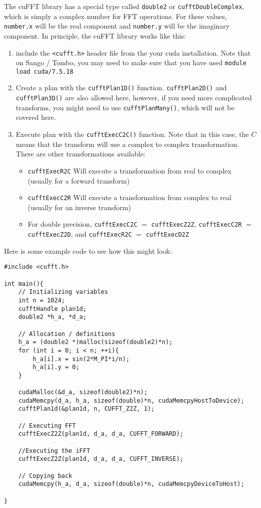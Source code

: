 \documentclass[11pt]{article}
\begin{document}
The cuFFT library has a special type called \lstinline{double2} or \lstinline{cufftDoubleComplex}, which is simply a complex number for FFT operations. For these values, \lstinline{number.x} will be the real component and \lstinline{number.y} will be the imaginary component. In principle, the cuFFT library works like this:
\begin{enumerate}
\item include the \lstinline{<cufft.h>} header file from the your cuda installation. Note that on Sango / Tombo, you may need to make sure that you have used \lstinline{module load cuda/7.5.18}
\item Create a plan with the \lstinline{cufftPlan1D()} function. \lstinline{cufftPlan2D()} and \lstinline{cufftPlan3D()} are also allowed here, however, if you need more complicated transforms, you might need to use \lstinline{cufftPlanMany()}, which will not be covered here.
\item Execute plan with the \lstinline{cufftExecC2C()} function. Note that in this case, the $C$ means that the transform will use a complex to complex transformation. There are other transformations available:
    \begin{itemize}
    \item \lstinline{cufftExecR2C} Will execute a transformation from real to complex (usually for a forward transform)
    \item \lstinline{cufftExecC2R} Will execute a transformation from complex to real (usually for an inverse transform)
    \item For double precision, \lstinline{cufftExecC2C} $=$ \lstinline{cufftExecZ2Z}, \lstinline{cufftExecC2R} $=$ \lstinline{cufftExecZ2D}, and \lstinline{cufftExecR2C} $=$ \lstinline{cufftExecD2Z}
    \end{itemize}
\end{enumerate}

Here is some example code to see how this might look:

\begin{lstlisting}
#include <cufft.h>

int main(){
    // Initializing variables
    int n = 1024;
    cufftHandle plan1d;
    double2 *h_a, *d_a;

    // Allocation / definitions
    h_a = (double2 *)malloc(sizeof(double2)*n);
    for (int i = 0; i < n; ++i){
        h_a[i].x = sin(2*M_PI*i/n);
        h_a[i].y = 0;
    }

    cudaMalloc(&d_a, sizeof(double2)*n);
    cudaMemcpy(d_a, h_a, sizeof(double)*n, cudaMemcpyHostToDevice);
    cufftPlan1d(&plan1d, n, CUFFT_Z2Z, 1);

    // Executing FFT
    cufftExecZ2Z(plan1d, d_a, d_a, CUFFT_FORWARD);

    //Executing the iFFT
    cufftExecZ2Z(plan1d, d_a, d_a, CUFFT_INVERSE);

    // Copying back
    cudaMemcpy(h_a, d_a, sizeof(double)*n, cudaMemcpyDeviceToHost);

}
\end{lstlisting}
\end{document}
